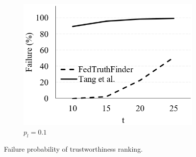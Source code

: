 \begin{figure}[t]
\begin{subfigure}[t]{.32\linewidth}
			\includegraphics[width=1\linewidth]{./fig/fail_trust_0.1.PNG}
			\caption{$p_l=0.1$}
			\label{fig:trust_0.1}
		\end{subfigure}
		\caption{Failure probability of trustworthiness ranking.}
		\label{fig:trust_failure}
\end{figure}

